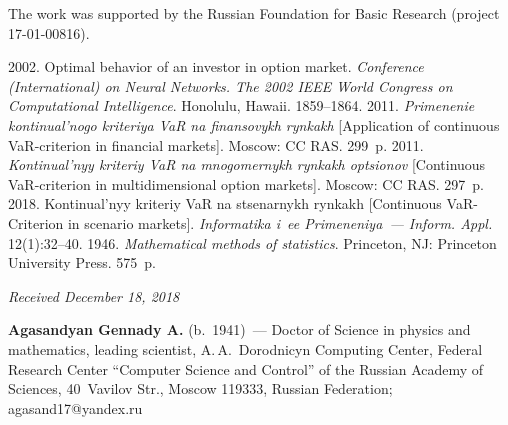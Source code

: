   
  
  

\vspace*{-18pt}

\Ack
  \noindent
  The work was supported by the Russian Foundation for Basic Research (project 
17-01-00816). 



  \begin{multicols}{2}

\renewcommand{\bibname}{\protect\rmfamily References}

{\small\frenchspacing
 {%
 \begin{thebibliography}{9}
   2002. Optimal behavior of an investor in option market. 
  \textit{Conference (International) on Neural Networks. The 2002 IEEE World Congress on Computational 
Intelligence}. Honolulu, Hawaii. 1859--1864. 
   2011. \textit{Primenenie kontinual'nogo kriteriya VaR na 
finansovykh rynkakh} [Application of continuous VaR-criterion in financial markets]. Moscow: 
CC RAS. 299~p.
   2011. \textit{Kontinual'nyy kriteriy VaR na mnogomernykh rynkakh 
optsionov} [Continuous VaR-criterion in multidimensional option markets]. Moscow: CC RAS. 297~p.
   2018. Kontinual'nyy kriteriy VaR na stsenarnykh rynkakh 
[Continuous VaR-Criterion in scenario markets]. 
\textit{Informatika i~ee Primeneniya~--- Inform. Appl.} 
12(1):32--40. 
   1946. \textit{Mathematical methods of statistics}. Princeton, NJ: Princeton 
University Press. 575~p. 
 \end{thebibliography}

 }
 }

\end{multicols}

\vspace*{-6pt}

\hfill{\small\textit{Received December 18, 2018}}


\vspace*{-22pt} 
  
  \Contrl
  
  \noindent
  \textbf{Agasandyan Gennady A.} (b.\ 1941)~--- Doctor of Science in physics and 
mathematics, leading scientist, A.\,A.~Dorodnicyn Computing Center, Federal 
Research Center ``Computer Science and Control'' of the Russian Academy of 
Sciences, 40~Vavilov Str., Moscow 119333, Russian Federation; 
\mbox{agasand17@yandex.ru}
\label{end\stat}

\renewcommand{\bibname}{\protect\rm Литература}    

   

   